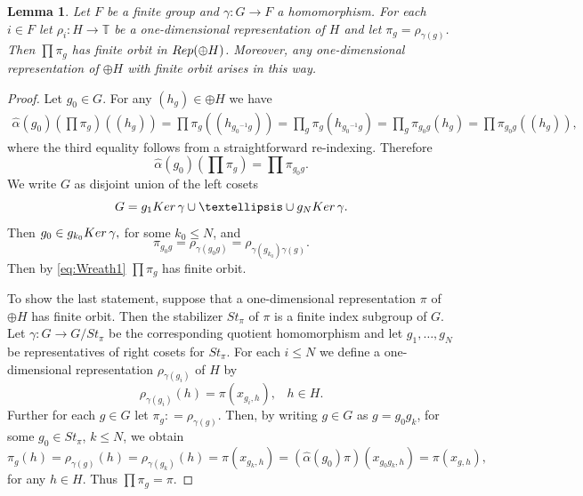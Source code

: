 \documentclass[11 pt, leqno, hidelinks]{amsart}%
\theoremstyle{plain}
\newtheorem{lemma}[theorem]{Lemma}
\numberwithin{equation}{section}
\newcommand{\Rep}{\textup{Rep}}
\newcommand{\Ker}{\textup{Ker}}
\begin{document}
\begin{lemma}\label{Wreath1} Let $F$ be a finite group and $\gamma: G \to F$  a homomorphism. For each $i\in F$ let $\rho_i: H \to \mathbb T$ be a one-dimensional representation of $H$ and let $\pi_g = \rho_{\gamma(g)}$.
Then $\prod\pi_g$ has   finite orbit in $\Rep(\oplus H)$. Moreover, any one-dimensional representation of $\oplus H$ with finite orbit arises in this way.
\end{lemma}
\begin{proof}  Let $g_0\in G$. For any $(h_g) \in \oplus H$ we have
\begin{multline*}\hat\alpha(g_0)(\prod\pi_g) ((h_g)) = \prod\pi_g\left((h_{{g_0}^{-1}g})\right) = \prod_g \pi_g(h_{{g_0}^{-1}g}) =  \prod_g \pi_{g_0g}(h_g) = \prod\pi_{g_0g} ((h_g)), \end{multline*}
where the third equality follows from a straightforward re-indexing. Therefore
\begin{equation}\label{eq:Wreath1}\hat\alpha(g_0)\left(\prod\pi_g\right)   = \prod\pi_{g_0g}.\end{equation}
We write $G$ as disjoint union of the left cosets $$G = g_1 \Ker\, \gamma \cup \ldots \cup g_N \Ker\, \gamma.$$ Then $g_0 \in g_{k_0} \Ker\, \gamma, $ for some $k_0\le N$, and
$$\pi_{g_0g}  = \rho_{\gamma(g_0g)} = \rho_{\gamma(g_{k_0})\gamma(g)}.$$ Then by \eqref{eq:Wreath1} $\prod\pi_g$ has   finite orbit.


To show the last statement, suppose that a one-dimensional representation $\pi$ of $\oplus H$ has finite orbit. Then the stabilizer $St_{\pi}$ of  $\pi$    is a finite index subgroup of $G$. Let
$\gamma: G \to G/St_{\pi}$ be the corresponding quotient homomorphism and let $g_1, \ldots, g_N$ be representatives of right cosets for $St_{\pi}$. For each $i\le N$ we define a one-dimensional representation $\rho_{\gamma(g_i)}$ of $H$ by
$$\rho_{\gamma(g_i)}(h) = \pi(x_{g_i, h}), \;\;\;h \in H.$$
Further for each $g \in G$ let $\pi_g: = \rho_{\gamma(g)}$. Then, by writing $g\in G$ as $g = g_0g_k$, for some $g_0\in St_{\pi}$, $k\le N$, we obtain
$$\pi_g(h) = \rho_{\gamma(g)}(h) = \rho_{\gamma(g_k)}(h) = \pi(x_{g_k, h}) = \left(\hat\alpha(g_0)\pi\right)(x_{g_0g_k, h}) = \pi(x_{g, h}),$$
for any $h\in H$.  Thus $\prod \pi_g = \pi.$
\end{proof}
\end{document}
